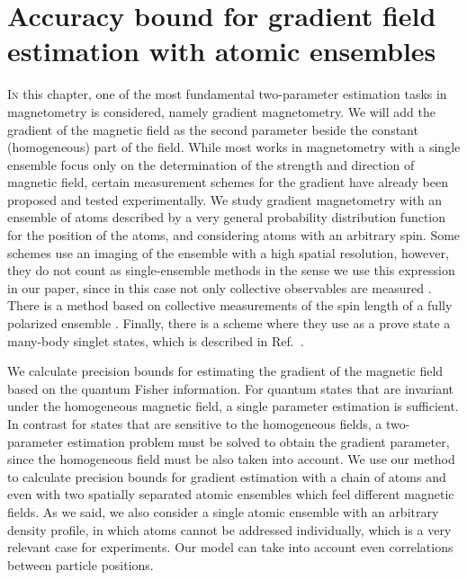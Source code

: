 \section[Metrology of the gradient magnetic field]
{Accuracy bound for gradient field estimation with atomic ensembles}
\label{sec:gradient-metrolgogy}



\lettrine[lines=2, findent=3pt, nindent=0pt]{I}{n} this chapter, one of the most fundamental two-parameter estimation tasks in magnetometry is considered, namely gradient magnetometry.
We will add the gradient of the magnetic field as the second parameter beside the constant (homogeneous) part of the field.
While most works in magnetometry with a single ensemble focus only on the determination of the strength and direction of magnetic field, certain measurement schemes for the gradient have already been proposed and tested experimentally.
We study gradient magnetometry with an ensemble of atoms described by a very general probability distribution function for the position of the atoms, and considering atoms with an arbitrary spin.
Some schemes use an imaging of the ensemble with a high spatial resolution, however, they do not count as single-ensemble methods in the sense we use this expression in our paper, since in this case not only collective observables are measured  \cite{Vengalattore2007,Zhou2010,Koschorreck2011}.
There is a method based on collective measurements of the spin length of a fully polarized ensemble \cite{Behbood2013}.
Finally, there is a scheme where they use as a prove state a many-body singlet states, which is described in Ref.~\cite{Urizar-Lanz2013}.

We calculate precision bounds for estimating the gradient of the magnetic field based on the quantum Fisher information.
For quantum states that are invariant under the homogeneous magnetic field, a single parameter estimation is sufficient.
In contrast for states that are sensitive to the homogeneous fields, a two-parameter estimation problem must be solved to obtain the gradient parameter, since the homogeneous field must be also taken into account.
We use our method to calculate precision bounds for gradient estimation with a chain of atoms and even with two spatially separated atomic ensembles which feel different magnetic fields.
As we said, we also consider a single atomic ensemble with an arbitrary density profile, in which atoms cannot be addressed individually, which is a very relevant case for experiments.
Our model can take into account even correlations between particle positions.

